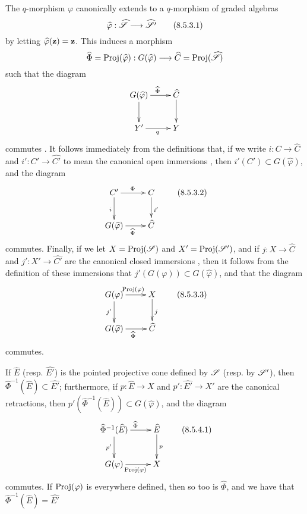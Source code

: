 \begin{env}[8.5.3]
\label{II.8.5.3}
The $q$-morphism $\varphi$ canonically extends to a $q$-morphism of graded algebras
\[
\label{II.8.5.3.1}
  \widehat{\varphi}: \widehat{\sh{S}} \to \widehat{\sh{S}'}
\tag{8.5.3.1}
\]
by letting $\widehat{\varphi}(\mathbf{z})=\mathbf{z}$.
This induces a morphism
\[
  \widehat{\Phi} = \Proj(\widehat{\varphi}) : G(\widehat{\varphi}) \to \widehat{C} = \Proj(\widehat{\sh{S}})
\]
such that the diagram
\[
  \xymatrix{
    G(\widehat{\varphi})
      \ar[r]^{\widehat{\Phi}}
      \ar[d]
  & \widehat{C}
      \ar[d]
  \\Y'
      \ar[r]_{q}
  & Y
  }
\]
commutes .
It follows immediately from the definitions that, if we write $i:C\to\widehat{C}$ and $i':C'\to\widehat{C'}$ to mean the canonical open immersions , then $i'(C')\subset G(\widehat{\varphi})$, and the diagram
\[
\label{eq:2.8.5.3.2}
  \xymatrix{
    C'
      \ar[r]^{\Phi}
      \ar[d]_{i}
  & C
      \ar[d]^{i'}
  \\G(\widehat{\varphi})
      \ar[r]_{\widehat{\Phi}}
  & \widehat{C}
  }
\tag{8.5.3.2}
\]
commutes.
Finally, if we let $X=\operatorname{Proj}(\mathscr{S})$ and $X'=\operatorname{Proj}(\mathscr{S}')$, and if $j:X\to\widehat{C}$ and $j':X'\to\widehat{C'}$ are the canonical closed immersions , then it follows from the definition of these immersions that $j'(G(\varphi))\subset G(\widehat{\varphi})$, and that the diagram
\[
\label{II.8.5.3.3}
  \xymatrix{
    G(\varphi)
      \ar[r]^{\Proj(\varphi)}
      \ar[d]_{j'}
  & X
      \ar[d]^{j}
  \\G(\widehat{\varphi})
      \ar[r]_{\widehat{\Phi}}
  & \widehat{C}
  }
\tag{8.5.3.3}
\]
commutes.
\end{env}

\begin{proposition}[8.5.4]
\label{II.8.5.4}
If $\widehat{E}$ (resp. $\widehat{E'}$) is the pointed projective cone defined by $\mathscr{S}$ (resp. by $\mathscr{S}'$), then $\widehat{\Phi}^{-1}(\widehat{E}) \subset \widehat{E'}$;
furthermore, if $p:\widehat{E}\to X$ and $p':\widehat{E'}\to X'$ are the canonical retractions, then $p'(\widehat{\Phi}^{-1}(\widehat{E})) \subset G(\widehat{\varphi})$, and the diagram
\[
\label{II.8.5.4.1}
  \xymatrix{
    \widehat{\Phi}^{-1}(\widehat{E})
      \ar[r]^{\widehat{\Phi}}
      \ar[d]_{p'}
  & \widehat{E}
      \ar[d]^{p}
  \\G(\varphi)
      \ar[r]_{\Proj(\varphi)}
  & X
  }
\tag{8.5.4.1}
\]
commutes.
If $\operatorname{Proj}(\varphi)$ is everywhere defined, then so too is $\widehat{\Phi}$, and we have that $\widehat{\Phi}^{-1}(\widehat{E}) = \widehat{E'}$
\end{proposition}

